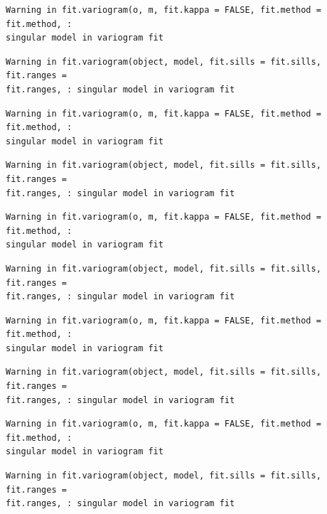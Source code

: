 \documentclass[
  letterpaper,
  DIV=11,
  numbers=noendperiod]{scrartcl}
\begin{document}
\begin{verbatim}
Warning in fit.variogram(o, m, fit.kappa = FALSE, fit.method = fit.method, :
singular model in variogram fit
\end{verbatim}

\begin{verbatim}
Warning in fit.variogram(object, model, fit.sills = fit.sills, fit.ranges =
fit.ranges, : singular model in variogram fit
\end{verbatim}

\begin{verbatim}
Warning in fit.variogram(o, m, fit.kappa = FALSE, fit.method = fit.method, :
singular model in variogram fit
\end{verbatim}

\begin{verbatim}
Warning in fit.variogram(object, model, fit.sills = fit.sills, fit.ranges =
fit.ranges, : singular model in variogram fit
\end{verbatim}

\begin{verbatim}
Warning in fit.variogram(o, m, fit.kappa = FALSE, fit.method = fit.method, :
singular model in variogram fit
\end{verbatim}

\begin{verbatim}
Warning in fit.variogram(object, model, fit.sills = fit.sills, fit.ranges =
fit.ranges, : singular model in variogram fit
\end{verbatim}

\begin{verbatim}
Warning in fit.variogram(o, m, fit.kappa = FALSE, fit.method = fit.method, :
singular model in variogram fit
\end{verbatim}

\begin{verbatim}
Warning in fit.variogram(object, model, fit.sills = fit.sills, fit.ranges =
fit.ranges, : singular model in variogram fit
\end{verbatim}

\begin{verbatim}
Warning in fit.variogram(o, m, fit.kappa = FALSE, fit.method = fit.method, :
singular model in variogram fit
\end{verbatim}

\begin{verbatim}
Warning in fit.variogram(object, model, fit.sills = fit.sills, fit.ranges =
fit.ranges, : singular model in variogram fit
\end{verbatim}
\end{document}
